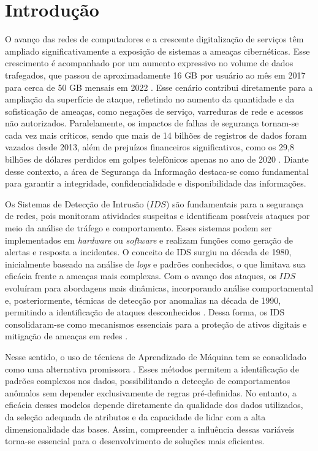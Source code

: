 \documentclass[a4paper,10pt, twocolumn]{article}
\begin{document}
\section{Introdução}


O avanço das redes de computadores e a crescente digitalização de serviços têm 
ampliado significativamente a exposição de sistemas a ameaças cibernéticas. Esse 
crescimento é acompanhado por um aumento expressivo no volume de dados trafegados, 
que passou de aproximadamente 16 GB por usuário ao mês em 2017 para cerca de 50 GB 
mensais em 2022 \cite{Thakkar2021Survey}. Esse cenário contribui diretamente para a ampliação da superfície 
de ataque, refletindo no aumento da quantidade e da sofisticação de ameaças, como 
negações de serviço, varreduras de rede e acessos não autorizados. Paralelamente, os 
impactos de falhas de segurança tornam-se cada vez mais críticos, sendo que mais de 
14 bilhões de registros de dados foram vazados desde 2013, além de prejuízos 
financeiros significativos, como os 29,8 bilhões de dólares perdidos em golpes 
telefônicos apenas no ano de 2020 \cite{zehedi2023comparative}. Diante desse contexto, a área de Segurança da 
Informação destaca-se como fundamental para garantir a integridade, confidencialidade 
e disponibilidade das informações.

Os Sistemas de Detecção de Intrusão ($IDS$) são fundamentais para a segurança de 
redes, pois monitoram atividades suspeitas e identificam possíveis ataques 
por meio da análise de tráfego e comportamento. Esses sistemas podem ser 
implementados em \textit{hardware} ou \textit{software} e realizam funções como geração de 
alertas e resposta a incidentes. O conceito de IDS surgiu na década de 1980, 
inicialmente baseado na análise de \textit{logs} e padrões conhecidos, o que limitava 
sua eficácia frente a ameaças mais complexas. Com o avanço dos ataques, os 
$IDS$ evoluíram para abordagens mais dinâmicas, incorporando análise comportamental 
e, posteriormente, técnicas de detecção por anomalias na década de 1990, 
permitindo a identificação de ataques desconhecidos \cite{patrick2022study}. Dessa forma, os IDS 
consolidaram-se como mecanismos essenciais para a proteção de ativos digitais 
e mitigação de ameaças em redes \cite{emad2022intrusion}. 

Nesse sentido, o uso de técnicas de Aprendizado de Máquina tem se consolidado como uma 
alternativa promissora \cite{Khraisat2019Survey}. Esses métodos permitem a identificação de padrões complexos 
nos dados, possibilitando a detecção de comportamentos anômalos sem depender 
exclusivamente de regras pré-definidas. No entanto, a eficácia desses modelos 
depende diretamente da qualidade dos dados utilizados, da seleção adequada de 
atributos e da capacidade de lidar com a alta dimensionalidade das bases. Assim, 
compreender a influência dessas variáveis torna-se essencial para o 
desenvolvimento de soluções mais eficientes.
\end{document}
